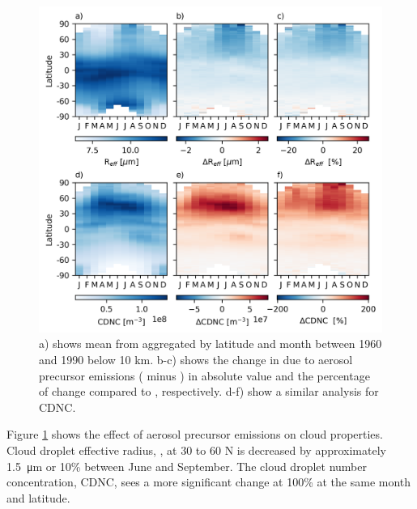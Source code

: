 \begin{figure}
    \centering
    \includegraphics{Chapter4/Figs/seasonal_cloud_props1_pothole.png}
    \caption[\Reff{} and CDNC aggregated by latitude and month between 1960 and 1989]{a) shows mean \Reff{} from \histsst{} aggregated by latitude and month between 1960 and 1990 below 10 km. b-c) shows the change in \Reff{} due to aerosol precursor emissions (\histsst{} minus \sstpiaer{}) in absolute value and the percentage of change compared to \sstpiaer{}, respectively. d-f) show a similar analysis for CDNC.}
    \label{fig:ch4:seasonal-cloud-props1}
\end{figure}


Figure \ref{fig:ch4:seasonal-cloud-props1} shows the effect of aerosol precursor emissions on cloud properties. Cloud droplet effective radius, \Reff{}, at 30 to 60 \textdegree N is decreased by approximately \qty{1.5}{\micro\metre} or 10\% between June and September. The cloud droplet number concentration, CDNC, sees a more significant change at 100\% at the same month and latitude. 



